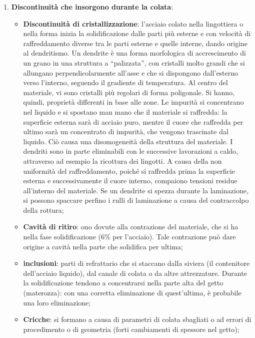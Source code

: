 \begin{enumerate}
\begin{itemize}
    \end{itemize}
    \item \textbf{Discontinuità che insorgono durante la colata}:
    \begin{itemize}
        \item \textbf{Discontinuità di cristallizzazione}: l’acciaio colato nella lingottiera o nella forma inizia la solidificazione dalle parti più esterne e con velocità di raffreddamento diverse tra le parti esterne e quelle interne, dando origine al dendritismo. Un dendrite è una forma morfologica di accrescimento di un grano in una struttura a “palizzata”, con cristalli molto grandi che si allungano perpendicolarmente all’asse e che si dispongono dall’esterno verso l’interno, seguendo il gradiente di temperatura. Al centro del materiale, vi sono cristalli più regolari di forma poligonale. Si hanno, quindi, proprietà differenti in base alle zone. Le impurità si concentrano nel liquido e si spostano man mano che il materiale si raffredda: la superficie esterna sarà di acciaio puro, mentre il cuore che raffredda per ultimo sarà un concentrato di impurità, che vengono trascinate dal liquido. Ciò causa una disomogeneità della struttura del materiale. I dendriti sono in parte eliminabili con le successive lavorazioni a caldo, attraverso ad esempio la ricottura dei lingotti. A causa della non uniformità del raffreddamento, poiché si raffredda prima la superficie esterna e successivamente il cuore interno, compaiono tensioni residue all’interno del materiale. Se un dendrite si spezza durante la laminazione, si possono spaccare perfino i rulli di laminazione a causa del contraccolpo della rottura;
        \item \textbf{Cavità di ritiro}: ono dovute alla contrazione del materiale, che si ha nella fase solidificazione (6\% per l’acciaio). Tale contrazione può dare origine a cavità nella parte che solidifica per ultima;
        \item \textbf{inclusioni}: parti di refrattario che si staccano dalla siviera (il contenitore dell’acciaio liquido), dal canale di colata o da altre attrezzature. Durante la solidificazione tendono a concentrarsi nella parte alta del getto (materozza): con una corretta eliminazione di quest’ultima, è probabile una loro eliminazione;
        \item \textbf{Cricche}: si formano a causa di parametri di colata sbagliati o ad errori di procedimento o di geometria (forti cambiamenti di spessore nel getto);

\end{itemize}
\end{enumerate}
